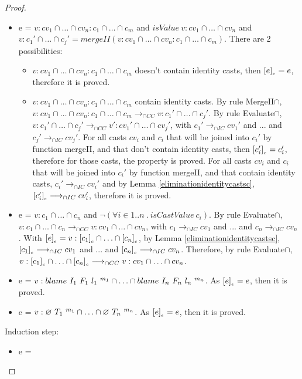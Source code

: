 \documentclass[a4paper]{article}
\begin{document}
\begin{proof}
\begin{itemize}
    \item e = $v : cv_1 \cap \ldots \cap cv_n : c_1 \cap \ldots \cap c_m$ and $isValue\ v : cv_1 \cap \ldots \cap cv_n$ and $v : c_1' \cap \ldots \cap c_j' = mergeII (v : cv_1 \cap \ldots \cap cv_n : c_1 \cap \ldots \cap c_m)$.
    There are 2 possibilities:
    \begin{itemize}
        \item $v : cv_1 \cap \ldots \cap cv_n : c_1 \cap \ldots \cap c_m$ doesn't contain identity casts, then $[e]_{_e} = e$, therefore it is proved.
        \item $v : cv_1 \cap \ldots \cap cv_n : c_1 \cap \ldots \cap c_m$ contain identity casts.
        By rule MergeII$\cap$, $v : cv_1 \cap \ldots \cap cv_n : c_1 \cap \ldots \cap c_m \longrightarrow_{\cap CC} v : c_1' \cap \ldots \cap c_j'$.
        By rule Evaluate$\cap$, $v : c_1' \cap \ldots \cap c_j' \longrightarrow_{\cap CC} v' : cv_1' \cap \ldots \cap cv_j'$, with $c_1' \longrightarrow_{\cap IC} cv_1'$ and ... and $c_j' \longrightarrow_{\cap IC} cv_j'$.
        For all casts $cv_i$ and $c_i$ that will be joined into $c_i'$ by function mergeII, and that don't contain identity casts, then $[c_i']_{_c} = c_i'$, therefore for those casts, the property is proved.
        For all casts $cv_i$ and $c_i$ that will be joined into $c_i'$ by function mergeII, and that contain identity casts, $c_i' \longrightarrow_{\cap IC} cv_i'$ and by Lemma \ref{eliminationidentitycastsc}, $[c_i']_{_c} \longrightarrow_{\cap IC} cv_i'$, therefore it is proved.
    \end{itemize}
    \item e = $v : c_1 \cap \ldots \cap c_n$ and $\neg(\forall i \in 1 .. n\ .\ isCastValue\ c_i)$.
    By rule Evaluate$\cap$, $v : c_1 \cap \ldots \cap c_n \longrightarrow_{\cap CC} v : cv_1 \cap \ldots \cap cv_n$, with $c_1 \longrightarrow_{\cap IC} cv_1$ and ... and $c_n \longrightarrow_{\cap IC} cv_n$.
    With $[e]_{_e} = v : [c_1]_{_c} \cap \ldots \cap [c_n]_{_c}$, by Lemma \ref{eliminationidentitycastsc}, $[c_1]_{_c} \longrightarrow_{\cap IC} cv_1$ and ... and $[c_n]_{_c} \longrightarrow_{\cap IC} cv_n$.
    Therefore, by rule Evaluate$\cap$, $v : [c_1]_{_c} \cap \ldots \cap [c_n]_{_c} \longrightarrow_{\cap CC} v : cv_1 \cap \ldots \cap cv_n$.
    \item e = $v : blame\ I_1\ F_1\ l_1\ ^{m_1} \cap \ldots \cap blame\ I_n\ F_n\ l_n\ ^{m_n}$.
    As $[e]_{_e} = e$, then it is proved.
    \item e = $v : \varnothing\ T_1\ ^{m_1} \cap \ldots \cap \varnothing\ T_n\ ^{m_n}$.
    As $[e]_{_e} = e$, then it is proved.
    \begin{comment}
    \item e = $v : cv_1 \cap \ldots \cap cv_n$ and $\neg(\forall i \in 1 .. n\ .\ isStuck\ c_i)$ and $\exists i \in 1 .. n\ .\ isStuck\ c_i$.
    As $\erasee{e} = e$, then it is proved.
    \end{comment}
\end{itemize}
Induction step:
\begin{itemize}
    \item e =
\end{itemize}
\end{proof}
\end{document}
